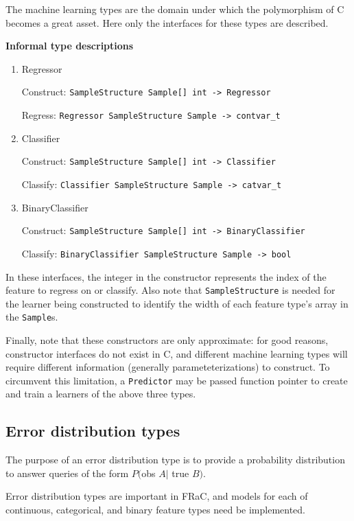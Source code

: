 \documentclass{article}
\newcommand{\CC}{C\nolinebreak\hspace{-.05em}\raisebox{.4ex}{\tiny\bf +}\nolinebreak\hspace{-.10em}\raisebox{.4ex}{\tiny\bf +}}
\begin{document}
\begin{multicols}{2}
The machine learning types are the domain under which the polymorphism of \CC{} becomes a great asset.  Here only the interfaces for these types are described.

\textbf{Informal type descriptions}
\begin{enumerate}

\item Regressor

Construct: \texttt{SampleStructure Sample[] int -> Regressor}

Regress: \texttt{Regressor SampleStructure Sample -> contvar\_t}

\item Classifier

Construct: \texttt{SampleStructure Sample[] int -> Classifier}

Classify: \texttt{Classifier SampleStructure Sample -> catvar\_t}

\item BinaryClassifier

Construct: \texttt{SampleStructure Sample[] int -> BinaryClassifier}

Classify: \texttt{BinaryClassifier SampleStructure Sample -> bool}

\end{enumerate}

In these interfaces, the integer in the constructor represents the index of the feature to regress on or classify.  Also note that \texttt{SampleStructure} is needed for the learner being constructed to identify the width of each feature type's array in the \texttt{Sample}s.  

Finally, note that these constructors are only approximate: for good reasons, constructor interfaces do not exist in \CC{}, and different machine learning types will require different information (generally parameteterizations) to construct.  To circumvent this limitation, a \texttt{Predictor} may be passed function pointer to create and train a learners of the above three types.


\subsection{Error distribution types}

\label{sec:edisttypes}

The purpose of an error distribution type is to provide a probability distribution to answer queries of the form $P($obs $A|$ true $B)$.

Error distribution types are important in FRaC, and models for each of continuous, categorical, and binary feature types need be implemented.


\end{multicols}
\end{document}
